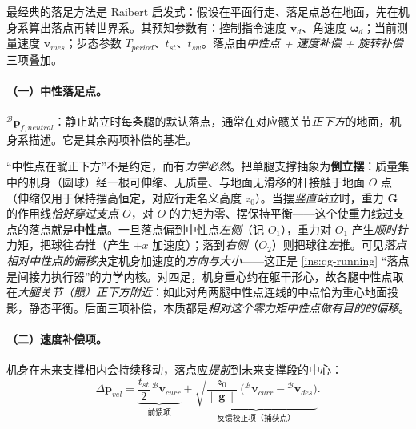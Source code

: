 最经典的落足方法是 Raibert 启发式\cite{raibert1986legged}：假设在平面行走、落足点总在地面，先在机身系算出落点再转世界系。其预知参数有：控制指令速度 $\mathbf{v}_d$、角速度 $\boldsymbol{\omega}_d$；当前测量速度 $\mathbf{v}_{mes}$；步态参数 $T_{period}$、$t_{st}$、$t_{sw}$。落点由\emph{中性点 + 速度补偿 + 旋转补偿}三项叠加。

\paragraph{（一）中性落足点。}
${}^{\mathcal{B}}\mathbf{p}_{f,neutral}$：静止站立时每条腿的默认落点，通常在对应髋关节\emph{正下方}的地面，机身系描述。它是其余两项补偿的基准。

\begin{insight}\label{ins:qg-neutral-why}
“中性点在髋正下方”不是约定，而有\emph{力学必然}\cite{unitree2023quadruped}。把单腿支撑抽象为\textbf{倒立摆}：质量集中的机身（圆球）经一根可伸缩、无质量、与地面无滑移的杆接触于地面 $O$ 点（伸缩仅用于保持摆高恒定，对应行走名义高度 $z_0$）。当摆\emph{竖直站立}时，重力 $\boldsymbol{G}$ 的作用线\emph{恰好穿过支点 $O$}，对 $O$ 的力矩为零、摆保持平衡——这个使重力线过支点的落点就是\textbf{中性点}。一旦落点偏到中性点\emph{左侧}（记 $O_1$），重力对 $O_1$ 产生\emph{顺时针}力矩，把球往\emph{右}推（产生 $+x$ 加速度）；落到\emph{右侧}（$O_2$）则把球往\emph{左}推。可见\emph{落点相对中性点的偏移}决定机身加速度的\emph{方向与大小}——这正是 \cref{ins:qg-running} “落点是间接力执行器”的力学内核。对四足，机身重心约在躯干形心，故各腿中性点取在\emph{大腿关节（髋）正下方附近}：如此对角两腿中性点连线的中点恰为重心地面投影，静态平衡。后面三项补偿，本质都是\emph{相对这个零力矩中性点做有目的的偏移}。
\end{insight}

\paragraph{（二）速度补偿项。}
机身在未来支撑相内会持续移动，落点应\emph{提前}到未来支撑段的中心\cite{unitree2023quadruped,pratt2006capture}：
\begin{equation}
  \Delta\mathbf{p}_{vel}=
  \underbrace{\frac{t_{st}}{2}\,{}^{\mathcal{B}}\mathbf{v}_{curr}}_{\text{前馈项}}
  +\underbrace{\sqrt{\frac{z_0}{\|\boldsymbol{g}\|}}\,\big({}^{\mathcal{B}}\mathbf{v}_{curr}-{}^{\mathcal{B}}\mathbf{v}_{des}\big)}_{\text{反馈校正项（捕获点）}}.
  \label{eq:qg-raibert-vel}
\end{equation}

